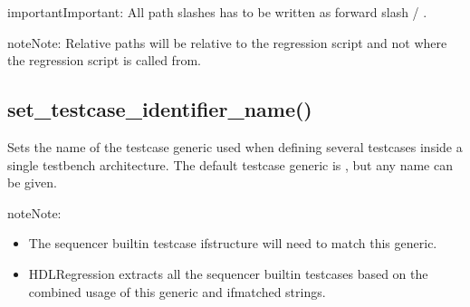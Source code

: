 \documentclass[letterpaper,10pt,english]{sphinxmanual}
\begin{document}
\sphinxAtStartPar
{}

\begin{sphinxVerbatim}[commandchars=\\\{\}]

 
\end{sphinxVerbatim}

\begin{sphinxadmonition}{important}{Important:}
\sphinxAtStartPar
All path slashes has to be written as forward slash / .
\end{sphinxadmonition}

\begin{sphinxadmonition}{note}{Note:}
\sphinxAtStartPar
Relative paths will be relative to the regression script
and not where the regression script is called from.
\end{sphinxadmonition}


\subsection{set\_testcase\_identifier\_name()}
\label{\detokenize{api:set-testcase-identifier-name}}
\sphinxAtStartPar
Sets the name of the testcase generic used when defining several testcases
inside a single testbench architecture. The default testcase generic is ,
but any name can be given.

\begin{sphinxadmonition}{note}{Note:}\begin{itemize}
\item {} 
\sphinxAtStartPar
The sequencer built\sphinxhyphen{}in testcase if\sphinxhyphen{}structure will need to match this generic.

\item {} 
\sphinxAtStartPar
HDLRegression extracts all the sequencer built\sphinxhyphen{}in testcases based on the combined usage of this generic
and if\sphinxhyphen{}matched strings.

\end{itemize}
\end{sphinxadmonition}
\end{document}
